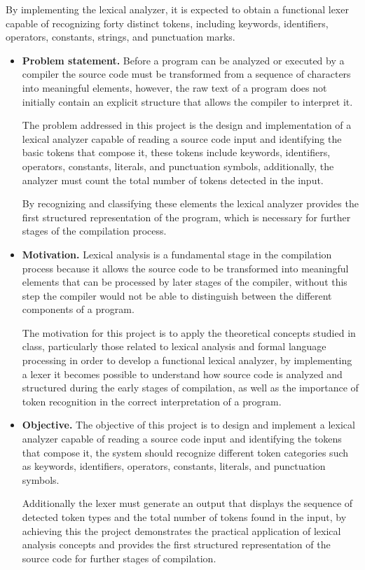\documentclass[letterpaper,12pt,oneside]{article}
\begin{document}
By implementing the lexical analyzer, it is expected to obtain a functional lexer capable of recognizing forty distinct tokens, including keywords, identifiers, operators, constants, strings, and punctuation marks.
\begin{itemize}
    \item \textbf{Problem statement.} Before a program can be analyzed or executed by a compiler the source code must be transformed from a sequence of characters into meaningful elements, however, the raw text of a program does not initially contain an explicit structure that allows the compiler to interpret it.
    
    The problem addressed in this project is the design and implementation of a lexical analyzer capable of reading a source code input and identifying the basic tokens that compose it, these tokens include keywords, identifiers, operators, constants, literals, and punctuation symbols, additionally, the analyzer must count the total number of tokens detected in the input.
    
    By recognizing and classifying these elements the lexical analyzer provides the first structured representation of the program, which is necessary for further stages of the compilation process.
    
    \item \textbf{Motivation.} Lexical analysis is a fundamental stage in the compilation process because it allows the source code to be transformed into meaningful elements that can be processed by later stages of the compiler, without this step the compiler would not be able to distinguish between the different components of a program.
    
    The motivation for this project is to apply the theoretical concepts studied in class, particularly those related to lexical analysis and formal language processing in order to develop a functional lexical analyzer, by implementing a lexer it becomes possible to understand how source code is analyzed and structured during the early stages of compilation, as well as the importance of token recognition in the correct interpretation of a program.
    
    \item \textbf{Objective.} The objective of this project is to design and implement a lexical analyzer capable of reading a source code input and identifying the tokens that compose it, the system should recognize different token categories such as keywords, identifiers, operators, constants, literals, and punctuation symbols.

    Additionally the lexer must generate an output that displays the sequence of detected token types and the total number of tokens found in the input, by achieving this the project demonstrates the practical application of lexical analysis concepts and provides the first structured representation of the source code for further stages of compilation.
    
\end{itemize}
\end{document}
